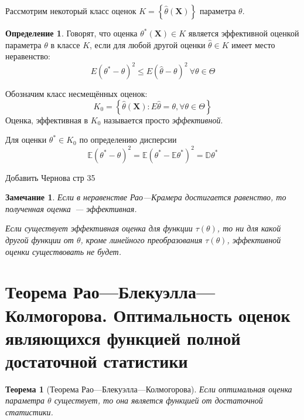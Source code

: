 \documentclass[oneside,final,14pt]{extreport}
\newtheorem{thm}{Теорема}[section]
\newtheorem*{rmrk}{Замечание}
\theoremstyle{definition}
\newtheorem{defn}{Определение}[section]
\begin{document}
Рассмотрим некоторый класс оценок $K=\left\{\hat{\theta}\left(\mathbf{X}\right)\right\}$ параметра $\theta$.
\begin{defn}
    Говорят, что оценка $\theta^{*}\left(\mathbf{X}\right) \in K$ является эффективной оценкой параметра $\theta$ в классе $K$, если для любой другой оценки $\hat{\theta} \in K$ имеет место неравенство:
    \begin{equation*}
        E\left(\theta^{*}-\theta\right)^{2} \leqslant E(\hat{\theta}-\theta)^{2}~ \forall \theta \in \Theta
    \end{equation*}
\end{defn}
Обозначим класс несмещённых оценок:
\begin{equation*}
    K_{0}=\left\{\hat{\theta}\left(\mathbf{X}\right): E \hat{\theta}=\theta, \forall \theta \in \Theta\right\}
\end{equation*}
Оценка, эффективная в $K_0$ называется просто {\it эффективной}.

Для оценки $\theta^{*} \in K_{0}$ по определению дисперсии
\begin{equation*}
    \mathbb{E}\left(\theta^{*}-\theta\right)^{2}=\mathbb{E}\left(\theta^{*}-\mathbb{E} \theta^{*}\right)^{2}=\mathbb{D} \theta^{*}
\end{equation*}

Добавить Чернова стр 35

\begin{rmrk}
Если в неравенстве Рао---Крамера достигается равенство, то полученная оценка~--- эффективная.

Если существует эффективная оценка для функции $\tau(\theta)$, то ни для какой другой функции от $\theta$, кроме линейного преобразования $\tau(\theta)$, эффективной оценки существовать не будет. 
\end{rmrk}

\section{Теорема Рао—Блекуэлла—Колмогорова. Оптимальность оценок являющихся функцией полной достаточной статистики}

\begin{thm}[Теорема Рао—Блекуэлла—Колмогорова] Если оптимальная оценка параметра $\theta$ существует, то она является функцией от достаточной статистики.
\end{thm}
\end{document}
